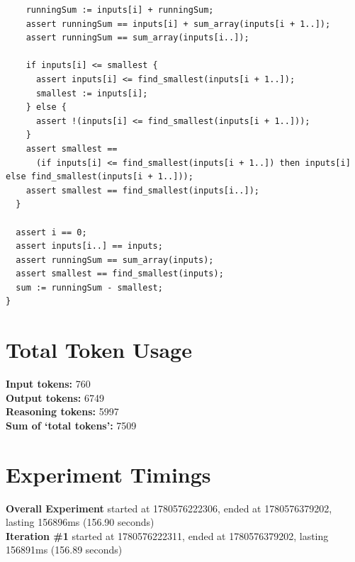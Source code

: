 \documentclass{article}
\begin{document}
\begin{lstlisting}
    runningSum := inputs[i] + runningSum;
    assert runningSum == inputs[i] + sum_array(inputs[i + 1..]);
    assert runningSum == sum_array(inputs[i..]);

    if inputs[i] <= smallest {
      assert inputs[i] <= find_smallest(inputs[i + 1..]);
      smallest := inputs[i];
    } else {
      assert !(inputs[i] <= find_smallest(inputs[i + 1..]));
    }
    assert smallest ==
      (if inputs[i] <= find_smallest(inputs[i + 1..]) then inputs[i] else find_smallest(inputs[i + 1..]));
    assert smallest == find_smallest(inputs[i..]);
  }

  assert i == 0;
  assert inputs[i..] == inputs;
  assert runningSum == sum_array(inputs);
  assert smallest == find_smallest(inputs);
  sum := runningSum - smallest;
}
\end{lstlisting}
\section*{Total Token Usage}
\textbf{Input tokens: }760
\\\textbf{Output tokens: }6749
\\\textbf{Reasoning tokens: }5997
\\\textbf{Sum of `total tokens': }7509
\section*{Experiment Timings}
\textbf{Overall Experiment} started at 1780576222306, ended at 1780576379202, lasting 156896ms (156.90 seconds)
\\\textbf{Iteration \#1} started at 1780576222311, ended at 1780576379202, lasting 156891ms (156.89 seconds)
\end{document}
